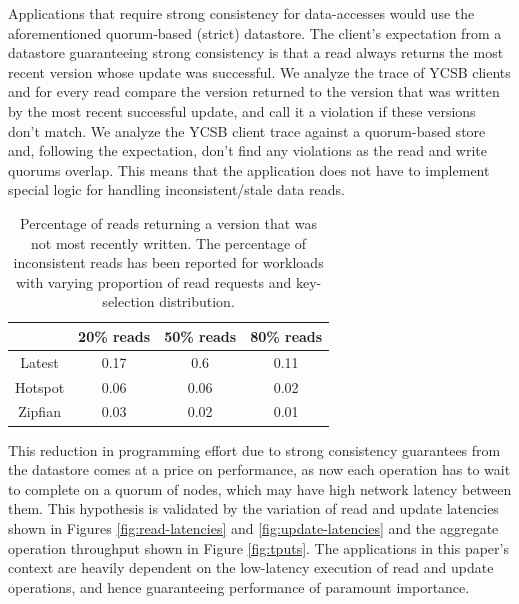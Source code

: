 \par Applications that require strong consistency for data-accesses would use the aforementioned quorum-based (strict) datastore. The client's expectation from a datastore guaranteeing strong consistency is that a read always returns the most recent version whose update was successful. We analyze the trace of YCSB clients and for every read compare the version returned to the version that was written by the most recent successful update, and call it a violation if these versions don't match. We analyze the YCSB client trace against a quorum-based store and, following the expectation, don't find any violations as the read and write quorums overlap. This means that the application does not have to implement special logic for handling inconsistent/stale data reads.
\begin{table}
\centering
\begin{tabular}{ |c|c|c|c| } 
 \hline
 & 20\% reads & 50\% reads & 80\% reads \\ 
 \hline
 Latest & 0.17 & 0.6 & 0.11 \\ 
 \hline
 Hotspot & 0.06 & 0.06 & 0.02 \\ 
 \hline
 Zipfian & 0.03 & 0.02 & 0.01 \\ 
 \hline
\end{tabular}
\caption{Percentage of reads returning a version that was not most recently written.  The percentage of inconsistent reads has been reported for workloads with varying proportion of read requests and key-selection distribution.}\label{tab:consistency_violations}
\end{table}
\par This reduction in programming effort due to strong consistency guarantees from the datastore comes at a price on performance, as now each operation has to wait to complete on a quorum of nodes, which may have high network latency between them. This hypothesis is validated by the variation of read and update latencies shown in Figures \ref{fig:read-latencies} and \ref{fig:update-latencies} and the aggregate operation throughput shown in Figure \ref{fig:tputs}. The applications in this paper's context are heavily dependent on the low-latency execution of read and update operations, and hence guaranteeing performance of paramount importance. 
